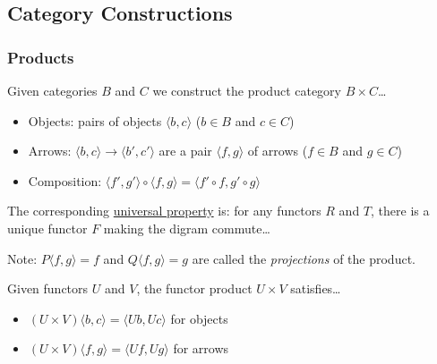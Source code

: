 \subsection{Category Constructions}\label{categoryconstructions}

\subsubsection{Products}\label{products}

Given categories $B$ and $C$ we construct the product category $B \times C$\dots
\begin{itemize}
  \item Objects: pairs of objects $\langle b,c \rangle$ ($b \in B$ and $c \in C$)
  \item Arrows: $\langle b,c \rangle \rightarrow \langle b',c' \rangle$ are a pair $\langle f,g \rangle$ of arrows ($f \in B$ and $g \in C$)
  \item Composition: $\langle f', g' \rangle \circ \langle f, g \rangle = \langle f' \circ f, g' \circ g \rangle$
\end{itemize}

\noindent The corresponding \hyperref[universality]{universal property} is: for any functors $R$ and $T$, there is a unique functor $F$ making the digram commute\dots

\begin{figure}[H]
\centering

\end{figure}

\noindent Note: $P\langle f,g \rangle = f$ and $Q\langle f,g \rangle = g$ are called the \emph{projections}\label{projections} of the product.

\label{functorproducts}
Given functors $U$ and $V$, the functor product $U \times V$ satisfies\dots
\begin{itemize}
  \item $(U \times V)\langle b,c \rangle = \langle Ub,Uc \rangle$ for objects
  \item $(U \times V)\langle f,g \rangle = \langle Uf,Ug \rangle$ for arrows
\end{itemize}

\begin{figure}[H]
\centering

\end{figure}

\label{bifunctors}

